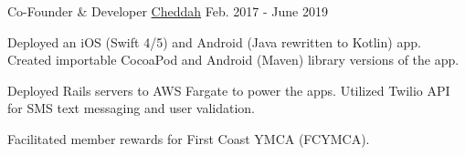 
\begin{cventries}

  \cventry
    {Co-Founder \& Developer} %
    {\href{https://apps.apple.com/us/app/cheddah/id968916652}{Cheddah}} %
    {} %
    {Feb. 2017 - June 2019} %
    {
      \begin{cvitems} %
        \item {Deployed an iOS (Swift 4/5) and Android (Java rewritten to Kotlin) app. Created importable CocoaPod and Android (Maven) library versions of the app.}
        \item {Deployed Rails servers to AWS Fargate to power the apps. Utilized Twilio API for SMS text messaging and user validation.}
        \item {Facilitated member rewards for First Coast YMCA (FCYMCA).}
      \end{cvitems}
    }


\end{cventries}